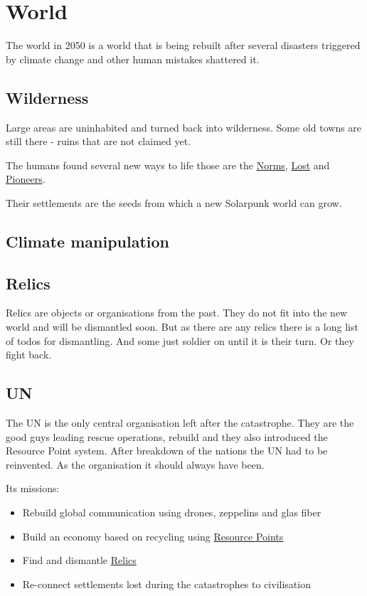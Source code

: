 \chapter{World}

The world in 2050 is a world that is being rebuilt after several disasters triggered by climate change and other human mistakes shattered it.

\section{Wilderness}

Large areas are uninhabited and turned back into wilderness. Some old towns are still there - ruins that are not claimed yet.

The humans found several new ways to life those are the \hyperref[sec: Norms]{Norms}, \hyperref[sec: Lost]{Lost} and \hyperref[sec: Pioneers]{Pioneers}.

Their settlements are the seeds from which a new Solarpunk world can grow.

\section{Climate manipulation}

\section{Relics}
\label{sec: Relic}
Relics are objects or organisations from the past. They do not fit into the new world and will be dismantled soon. But as there are any relics there is a long list of todos for dismantling. And some just soldier on until it is their turn. Or they fight back.

\section{UN}
\label{sec: UN}

The UN is the only central organisation left after the catastrophe. They are the good guys leading rescue operations, rebuild and they also introduced the Resource Point system. After breakdown of the nations the UN had to be reinvented. As the organisation it should always have been.

Its missions:

\begin{itemize}
    \item Rebuild global communication using drones, zeppelins and glas fiber
    \item Build an economy based on recycling using \hyperref[sec:Resource Points]{Resource Points}
    \item Find and dismantle \hyperref[sec: Relic]{Relics}
    \item Re-connect settlements lost during the catastrophes to civilisation
\end{itemize}

